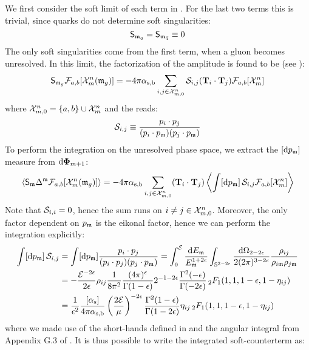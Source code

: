 We first consider the soft limit of each term in . For the last two terms this is trivial, since quarks do not determine soft singularities:
\begin{equation*}
  \mathsf{S}_{\mathfrak{m}_q} = \mathsf{S}_{\mathfrak{m}_{\bar{q}}} \equiv 0
\end{equation*}
The only soft singularities come from the first term, when a gluon becomes unresolved. In this limit, the factorization of the amplitude is found to be (see \cite{Catani-1997}):
\begin{equation}
  \mathsf{S}_{\mathfrak{m}_g} \mathcal{F}_{a,b}[\mathcal{X}^{n}_{m}(\mathfrak{m}_g)] = - 4\pi \alpha_\text{s,b} \sum_{i,j \in \mathcal{X}^{n}_{m,0}} \mathcal{S}_{i,j} (\mathbf{T}_i \cdot \mathbf{T}_j) \mathcal{F}_{a,b}[\mathcal{X}^{n}_{m}]
  \label{eq:soft-lim}
\end{equation}
where $ \mathcal{X}^{n}_{m,0} = \{a,b\} \cup \mathcal{X}^{n}_{m} $ and the  reads:
\begin{equation}
  \mathcal{S}_{i,j} \equiv \frac{p_i \cdot p_j}{(p_i \cdot p_{\mathfrak{m}}) (p_j \cdot p_{\mathfrak{m}})}
\end{equation}
To perform the integration on the unresolved phase space, we extract the $ [\mathrm{d} p_{\mathfrak{m}}] $ measure from $ \mathrm{d} \boldsymbol{\Phi}_{m+1} $:
\begin{equation*}
  \left\langle \mathsf{S}_{\mathfrak{m}} \Delta^{\mathfrak{m}} \mathcal{F}_{a,b}[\mathcal{X}^{n}_{m}(\mathfrak{m}_g)] \right\rangle = - 4\pi \alpha_\text{s,b} \sum_{i,j \in \mathcal{X}^{n}_{m,0}} (\mathbf{T}_i \cdot \mathbf{T}_j) \left\langle \int [\mathrm{d} p_{\mathfrak{m}}] \, \mathcal{S}_{i,j} \mathcal{F}_{a,b}[\mathcal{X}^{n}_{m}] \right\rangle
\end{equation*}
Note that $ \mathcal{S}_{i,i} = 0 $, hence the sum runs on $ i \neq j \in \mathcal{X}^{n}_{m,0} $. Moreover, the only factor dependent on $ p_{\mathfrak{m}} $ is the eikonal factor, hence we can perform the integration explicitly:
\begin{equation*}
  \begin{split}
    \int [\mathrm{d} p_{\mathfrak{m}}] \, \mathcal{S}_{i,j}
    & = \int [\mathrm{d} p_{\mathfrak{m}}] \frac{p_i \cdot p_j}{(p_i \cdot p_j) (p_j \cdot p_{\mathfrak{m}})} = \int_0^{\mathcal{E}} \frac{\mathrm{d} E_{\mathfrak{m}}}{E_{\mathfrak{m}}^{1+2\epsilon}} \int_{\mathbb{S}^{2-2\epsilon}} \frac{\mathrm{d} \Omega_{2-2\epsilon}}{2(2\pi)^{3-2\epsilon}} \frac{\rho_{ij}}{\rho_{i\mathfrak{m}} \rho_{j\mathfrak{m}}} \\
    & = - \frac{\mathcal{E}^{-2\epsilon}}{2\epsilon} \rho_{ij} \frac{1}{8\pi^2} \frac{(4\pi)^\epsilon}{\Gamma(1-\epsilon)} 2^{-1-2\epsilon} \frac{\Gamma^2(-\epsilon)}{\Gamma(-2\epsilon)} \,{_2F_1}(1,1,1-\epsilon,1-\eta_{ij}) \\
    & = \frac{1}{\epsilon^2} \frac{[\alpha_\text{s}]}{4\pi \alpha_\text{s,b}} \left( \frac{2\mathcal{E}}{\mu} \right)^{-2\epsilon} \frac{\Gamma^2(1-\epsilon)}{\Gamma(1-2\epsilon)} \eta_{ij} \,{_2F_1}(1,1,1-\epsilon,1-\eta_{ij})
  \end{split}
\end{equation*}
where we made use of the short-hands defined in  and the angular integral from Appendix G.3 of \cite{Asteriadis-2020}. It is thus possible to write the integrated soft-counterterm as:
